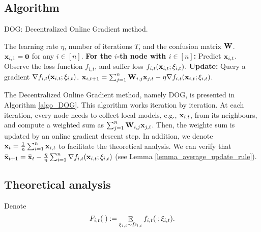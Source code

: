 \documentclass{article}
\begin{document}
\subsection{Algorithm}


\begin{algorithm}[!]
   \caption{\textsc{DOG}: Decentralized Online Gradient method.}
   \label{algo_DOG}
   \begin{algorithmic}[1]
   \REQUIRE The learning rate $\eta$, number of iterations $T$, and the confusion matrix ${\bf W}$. ${\bf x}_{i,1} = {\bf 0}$ for any $i\in [n]$.
            \STATE \textbf{For the $i$-th node with $i\in[n]$:}
            \STATE \indent Predict ${\bf x}_{i,t}$.
            \STATE \indent Observe the loss function $f_{i,t}$,  and suffer loss $f_{i,t}({\bf x}_{i,t};\xi_{i,t})$.
            \STATE \textbf{Update:}
            \STATE \indent Query a gradient $\nabla f_{i,t}({\bf x}_{i,t};\xi_{i,t})$.  
            \STATE \indent ${\bf x}_{i,t+1} = \sum_{j=1}^n {\bf W}_{i,j}{\bf x}_{j,t} - \eta \nabla f_{i,t}({\bf x}_{i,t};\xi_{i,t})$. 
       \ENDFOR
   \end{algorithmic}
\end{algorithm}


The Decentralized Online Gradient method, namely \textsc{DOG}, is presented in Algorithm \ref{algo_DOG}. This algorithm works iteration by iteration.
At each iteration, every node needs to collect local models, e.g., ${\bf x}_{i,t}$, from its neighbours, and compute a weighted sum as $ \sum_{j=1}^n {\bf W}_{i,j}{\bf x}_{j,t}$. Then, the weighte sum is updated by an online gradient descent step. In addition, we denote $\bar{{\bf x}}_t = \frac{1}{n}\sum_{i=1}^n {\bf x}_{i,t}$ to facilitate the theoretical analysis. We can verify that $\bar{{\bf x}}_{t+1} =  \bar{{\bf x}}_t -  \frac{\eta}{n}\sum_{i=1}^n \nabla f_{i,t}({\bf x}_{i,t};\xi_{i,t})$ (see Lemma \ref{lemma_average_update_rule}). 



\subsection{Theoretical analysis}
\label{subsection_theoretical_analysis}
Denote 
\begin{align}
\nonumber
F_{i,t}(\cdot) := \mathop{\mathbb{E}}_{\xi_{i,t} \sim D_{i,t}} f_{i,t}(\cdot; \xi_{i,t}).
\end{align}
\end{document}
